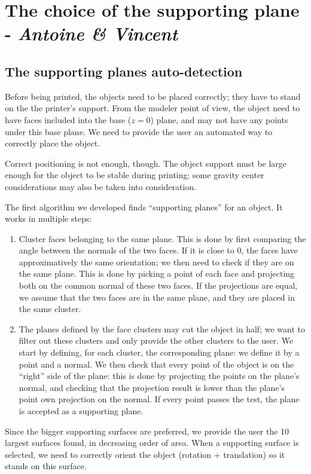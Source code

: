 \documentclass{report}
\begin{document}
\section{The choice of the supporting plane - \textit{Antoine \& Vincent}}

\subsection{The supporting planes auto-detection}
Before being printed, the objects need to be placed correctly; they have to stand on the the printer’s support. From the modeler point of view, the object need to have faces included into the base ($z = 0$) plane, and may not have any points under this base plane. We need to provide the user an automated way to correctly place the object.

Correct positioning is not enough, though. The object support must be large enough for the object to be stable during printing; some gravity center considerations may also be taken into consideration.

The first algorithm we developed finds “supporting planes” for an object. It works in multiple steps:
\begin{enumerate}
\item Cluster faces belonging to the same plane. This is done by first comparing the angle between the normals of the two faces. If it is close to $0$, the faces have approximatively the same orientation; we then need to check if they are on the same plane. This is done by picking a point of each face and projecting both on the common normal of these two faces. If the projections are equal, we assume that the two faces are in the same plane, and they are placed in the same cluster.
\item The planes defined by the face clusters may cut the object in half; we want to filter out these clusters and only provide the other clusters to the user. We start by defining, for each cluster, the corresponding plane: we define it by a point and a normal. We then check that every point of the object is on the “right” side of the plane: this is done by projecting the points on the plane’s normal, and checking that the projection result is lower than the plane’s point own projection on the normal. If every point passes the test, the plane is accepted as a supporting plane.
\end{enumerate}

Since the bigger supporting surfaces are preferred, we provide the user the 10 largest surfaces found, in decreasing order of area. When a supporting surface is selected, we need to correctly orient the object (rotation + translation) so it stands on this surface.
\end{document}
